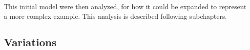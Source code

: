 This initial model were then analyzed, for how it could be expanded to represent a more complex example. This analysis is described following subchapters.










\subsection{Variations}



